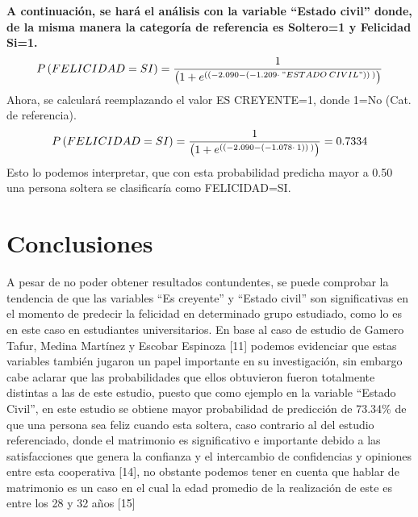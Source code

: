 \documentclass[conference]{IEEEtran}
\begin{document}
\textbf{A continuación, se hará el análisis con la variable “Estado civil” donde, de la misma manera la categoría de referencia es Soltero=1 y Felicidad Si=1.}\\   
\begin{equation}\tiny
P\left(FELICIDAD=SI\right)=\frac{1}{\left(1+e^{\left(\left(-2.090-\left(-1.209\cdot \:"ESTADO\:CIVIL"\right)\right)\:\right)}\right)}
\end{equation}
   Ahora, se calculará reemplazando el valor ES CREYENTE=1, donde 1=No (Cat. de referencia). \\
   \begin{equation}\tiny
 P\left(FELICIDAD=SI\right)=\frac{1}{\left(1+e^{\left(\left(-2.090-\left(-1.078\cdot \:1\right)\right)\:\right)}\right)}=0.7334
 \end{equation}
 Esto lo podemos interpretar, que con esta probabilidad predicha mayor a 0.50 una persona soltera se clasificaría como FELICIDAD=SI.\\
\section{Conclusiones}
   A pesar de no poder obtener resultados contundentes, se puede comprobar la tendencia de que las variables “Es creyente” y “Estado civil” son significativas en el momento de predecir la felicidad en determinado grupo estudiado, como lo es en este caso en estudiantes universitarios. En base al caso de estudio de  Gamero Tafur, Medina Martínez y Escobar Espinoza [11] podemos evidenciar que estas variables también jugaron un papel importante en su investigación, sin embargo cabe aclarar que las probabilidades que ellos obtuvieron fueron totalmente distintas a las de este estudio, puesto que como ejemplo en la variable “Estado Civil”, en este estudio se obtiene mayor probabilidad de predicción de 73.34\% de que una persona sea feliz cuando esta soltera, caso contrario al del estudio referenciado, donde el matrimonio es significativo e importante debido a las satisfacciones que genera la confianza y el intercambio de confidencias y opiniones entre esta cooperativa [14], no obstante podemos tener en cuenta que hablar de matrimonio es un caso en el cual la edad promedio de la realización de este es entre los 28 y 32 años [15]\\
   
\end{document}
